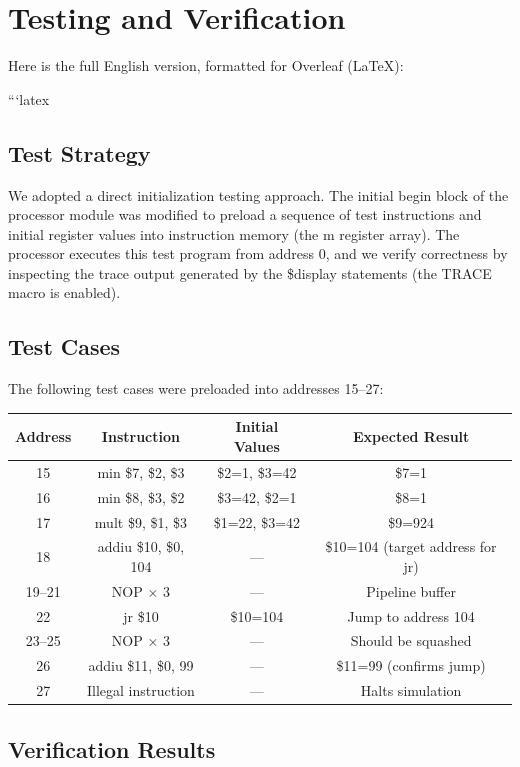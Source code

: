 \documentclass[conference]{IEEEtran}
\begin{document}
\section{Testing and Verification}
Here is the full English version, formatted for Overleaf (LaTeX):

```latex
\subsection{Test Strategy}

We adopted a direct initialization testing approach. The initial begin block of the processor module was modified to preload a sequence of test instructions and initial register values into instruction memory (the m register array). The processor executes this test program from address 0, and we verify correctness by inspecting the trace output generated by the \$display statements (the TRACE macro is enabled).

\subsection{Test Cases}

The following test cases were preloaded into addresses 15–27:

\begin{table}[h]
\centering
\begin{tabular}{|c|c|c|c|}
\hline
Address & Instruction & Initial Values & Expected Result \\
\hline
15 & min \$7, \$2, \$3 & \$2=1, \$3=42 & \$7=1 \\
16 & min \$8, \$3, \$2 & \$3=42, \$2=1 & \$8=1 \\
17 & mult \$9, \$1, \$3 & \$1=22, \$3=42 & \$9=924 \\
18 & addiu \$10, \$0, 104 & — & \$10=104 (target address for jr) \\
19–21 & NOP × 3 & — & Pipeline buffer \\
22 & jr \$10 & \$10=104 & Jump to address 104 \\
23–25 & NOP × 3 & — & Should be squashed \\
26 & addiu \$11, \$0, 99 & — & \$11=99 (confirms jump) \\
27 & Illegal instruction & — & Halts simulation \\
\hline
\end{tabular}
\end{table}

\subsection{Verification Results}
\end{document}
